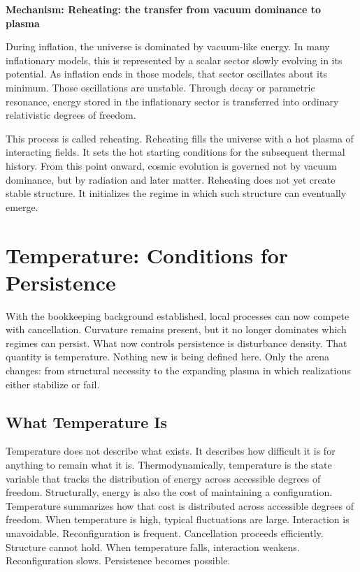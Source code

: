 \documentclass[11pt,twoside,openright]{book}
\newenvironment{mechanismboxpage}[1]
  {\par\medskip
   \noindent
   \begin{minipage}{\linewidth}
   \begin{framed}
   \noindent\textbf{Mechanism: #1}\par\medskip}
  {\end{framed}
   \end{minipage}
   \par\medskip}
\begin{document}
\begin{mechanismboxpage}{Reheating: the transfer from vacuum dominance to plasma}

During inflation, the universe is dominated by vacuum-like energy. In many inflationary models, this is represented by a scalar sector slowly evolving in its potential. As inflation ends in those models, that sector oscillates about its minimum. Those oscillations are unstable. Through decay or parametric resonance, energy stored in the inflationary sector is transferred into ordinary relativistic degrees of freedom.

This process is called reheating. Reheating fills the universe with a hot plasma of interacting fields. It sets the hot starting conditions for the subsequent thermal history. From this point onward, cosmic evolution is governed not by vacuum dominance, but by radiation and later matter. Reheating does not yet create stable structure. It initializes the regime in which such structure can eventually emerge.

\end{mechanismboxpage}
\chapter{Temperature: Conditions for Persistence}

With the bookkeeping background established, local processes can now compete with cancellation. Curvature remains present, but it no longer dominates which regimes can persist. What now controls persistence is disturbance density. That quantity is temperature. Nothing new is being defined here. Only the arena changes: from structural necessity to the expanding plasma in which realizations either stabilize or fail.

\section*{What Temperature Is}

Temperature does not describe what exists. It describes how difficult it is for anything to remain what it is. Thermodynamically, temperature is the state variable that tracks the distribution of energy across accessible degrees of freedom. Structurally, energy is also the cost of maintaining a configuration. Temperature summarizes how that cost is distributed across accessible degrees of freedom. When temperature is high, typical fluctuations are large. Interaction is unavoidable. Reconfiguration is frequent. Cancellation proceeds efficiently. Structure cannot hold. When temperature falls, interaction weakens. Reconfiguration slows. Persistence becomes possible.
\end{document}
